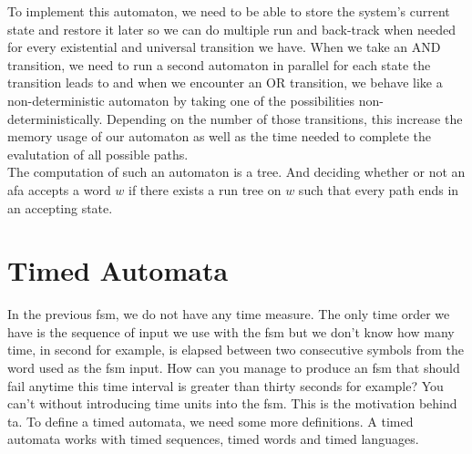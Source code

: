 \documentclass[12pt]{article}
\theoremstyle{definition}
\theoremstyle{definition}
\theoremstyle{remark}
\begin{document}
To implement this automaton, we need to be able to store the system's current state and restore it later so we can do multiple run and back-track when needed for every existential and universal transition we have. When we take an AND transition, we need to run a second automaton in parallel for each state the transition leads to and when we encounter an OR transition, we behave like a non-deterministic automaton by taking one of the possibilities non-deterministically. Depending on the number of those transitions, this increase the memory usage of our automaton as well as the time needed to complete the evalutation of all possible paths.\\

The computation of such an automaton is a tree. And deciding whether or not an \gls{afa} accepts a word $w$ if there exists a run tree on $w$ such that every path ends in an accepting state.~\cite{AFA:2017}\\



\section{Timed Automata}


In the previous \gls{fsm}, we do not have any time measure. The only time order we have is the sequence of input we use with the \gls{fsm} but we don't know how many time, in second for example, is elapsed between two consecutive symbols from the word used as the \gls{fsm} input. How can you manage to produce an \gls{fsm} that should fail anytime this time interval is greater than thirty seconds for example? You can't without introducing time units into the \gls{fsm}. This is the motivation behind \gls{ta}. To define a timed automata, we need some more definitions. A timed automata works with timed sequences, timed words and timed languages.\\
\end{document}

